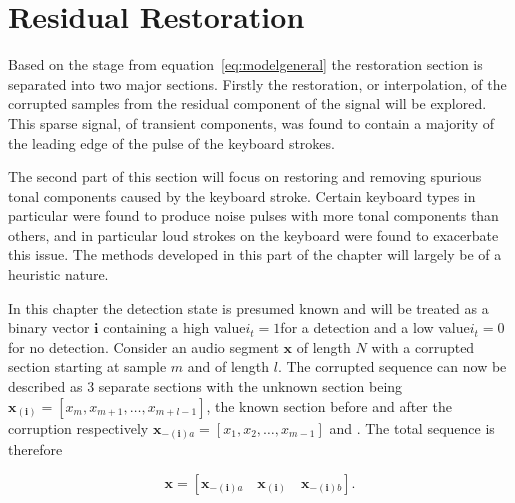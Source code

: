 \section{Residual Restoration}
Based on the \DIFdelbegin {}\DIFdelend \DIFaddbegin {}\DIFaddend stage from equation~\ref{eq:modelgeneral} the restoration section is separated into two major sections. Firstly the restoration, or interpolation, of the corrupted samples from the residual component of the signal will be explored. This sparse signal, of transient components, was found to contain a majority of the leading edge of the pulse of the keyboard strokes.

The second part of this section will focus on restoring and removing spurious tonal components caused by the keyboard stroke. Certain keyboard types in particular were found to produce noise pulses with more tonal components than others, and in particular loud strokes on the keyboard were found to exacerbate this issue. The methods developed in this part of the chapter will largely be of a heuristic nature.

In this chapter the detection state is presumed known and will be treated as a binary vector $\boldsymbol{i}$ containing a high value\DIFaddbegin \DIFadd{, }\DIFaddend $i_t = 1$\DIFaddbegin \DIFadd{, }\DIFaddend for a detection and a low value\DIFaddbegin \DIFadd{, }\DIFaddend $i_t = 0$\DIFaddbegin \DIFadd{, }\DIFaddend for no detection. Consider an audio segment $\boldsymbol{x}$ of length $N$ with a corrupted section starting at sample $m$ and of length $l$. The corrupted sequence can now be described as 3 separate sections with the unknown section being $\boldsymbol{x_{(i)}} = [x_m,x_{m+1},\ldots,x_{m+l-1}]$, the known section before and after the corruption respectively $\boldsymbol{x}_{\boldsymbol{-(i)}a} = [x_1,x_{2},\ldots,x_{m-1}]$ and \DIFdelbegin {}\DIFdelend \DIFaddbegin {}\DIFaddend . The total sequence is therefore

\begin{equation}\label{eq:RestBasicModel}
\boldsymbol{x} = \left[ \boldsymbol{x}_{\boldsymbol{-(i)}a}\quad\boldsymbol{x_{(i)}}\quad\boldsymbol{x}_{\boldsymbol{-(i)}b} \right].
\end{equation}


